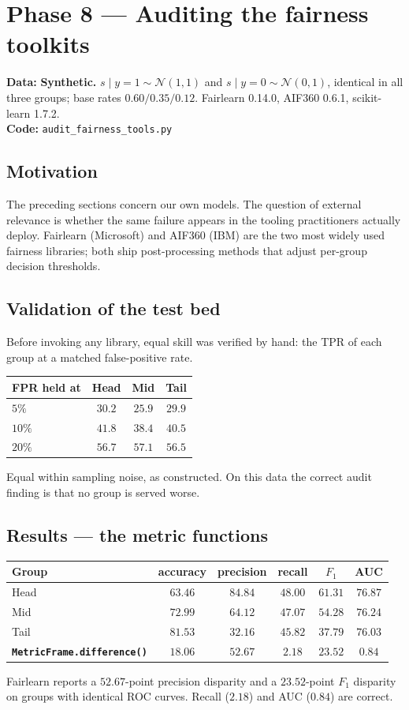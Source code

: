 \documentclass[11pt,a4paper]{article}
\newcommand{\datatag}[2]{%
  \begin{center}\small
  \colorbox{boxbg}{\parbox{0.965\linewidth}{\textbf{Data:} #1 \\ \textbf{Code:} \texttt{#2}}}
  \end{center}}
\begin{document}
\section{Phase 8 --- Auditing the fairness toolkits}\label{sec:tools}
\datatag{\textbf{Synthetic.} $s \mid y{=}1 \sim \mathcal{N}(1,1)$ and $s \mid y{=}0 \sim \mathcal{N}(0,1)$, identical in all three groups; base rates $0.60/0.35/0.12$. Fairlearn 0.14.0, AIF360 0.6.1, scikit-learn 1.7.2.}{audit\_fairness\_tools.py}

\subsection{Motivation}
The preceding sections concern our own models. The question of external
relevance is whether the same failure appears in the tooling practitioners
actually deploy. Fairlearn (Microsoft) and AIF360 (IBM) are the two most widely
used fairness libraries; both ship post-processing methods that adjust per-group
decision thresholds.

\subsection{Validation of the test bed}
Before invoking any library, equal skill was verified by hand: the TPR of each
group at a matched false-positive rate.
\begin{center}
\begin{tabular}{lccc}
\toprule
FPR held at & Head & Mid & Tail \\
\midrule
$5\%$ & $30.2$ & $25.9$ & $29.9$ \\
$10\%$ & $41.8$ & $38.4$ & $40.5$ \\
$20\%$ & $56.7$ & $57.1$ & $56.5$ \\
\bottomrule
\end{tabular}
\end{center}
\noindent Equal within sampling noise, as constructed. On this data the correct
audit finding is that no group is served worse.

\subsection{Results --- the metric functions}
\begin{center}
\begin{tabular}{lccccc}
\toprule
Group & accuracy & precision & recall & $F_1$ & AUC \\
\midrule
Head & $63.46$ & $84.84$ & $48.00$ & $61.31$ & $76.87$ \\
Mid & $72.99$ & $64.12$ & $47.07$ & $54.28$ & $76.24$ \\
Tail & $81.53$ & $32.16$ & $45.82$ & $37.79$ & $76.03$ \\
\midrule
\textbf{\texttt{MetricFrame.difference()}} & $18.06$ & $\mathbf{52.67}$ & $2.18$ & $\mathbf{23.52}$ & $\mathbf{0.84}$ \\
\bottomrule
\end{tabular}
\end{center}
\noindent Fairlearn reports a $52.67$-point precision disparity and a
$23.52$-point $F_1$ disparity on groups with identical ROC curves. Recall
($2.18$) and AUC ($0.84$) are correct.
\end{document}
